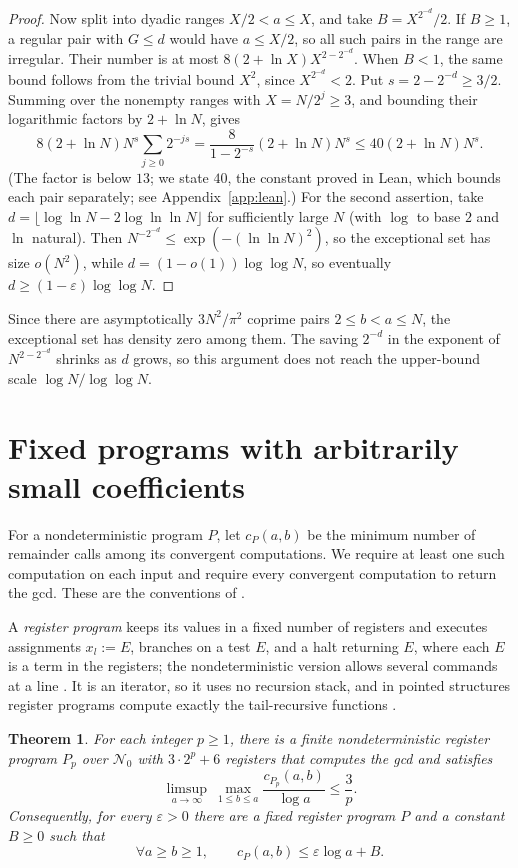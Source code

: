 \documentclass[11pt]{article}
\newtheorem{theorem}{Theorem}
\theoremstyle{remark}
\begin{document}
\begin{proof}
Now split into dyadic ranges $X/2<a\leq X$, and take
$B=X^{2^{-d}}/2$. If $B\geq1$, a regular pair with $G\leq d$ would have
$a\leq X/2$, so all such pairs in the range are irregular. Their number is
at most $8(2+\ln X)X^{2-2^{-d}}$.
When $B<1$, the same bound follows from the trivial bound $X^2$, since
$X^{2^{-d}}<2$.
Put $s=2-2^{-d}\geq3/2$. Summing over the nonempty ranges with
$X=N/2^j\geq3$, and bounding their logarithmic factors by $2+\ln N$, gives
\[
8(2+\ln N)N^s\sum_{j\geq0}2^{-js}
 =\frac{8}{1-2^{-s}}(2+\ln N)N^s
 \leq40(2+\ln N)N^s.
\]
(The factor is below $13$; we state $40$, the constant proved in Lean,
which bounds each pair separately; see Appendix~\ref{app:lean}.)
For the second assertion, take
$d=\lfloor\log\ln N-2\log\ln\ln N\rfloor$ for sufficiently large $N$
(with $\log$ to base $2$ and $\ln$ natural).
Then $N^{-2^{-d}}\leq\exp(-(\ln\ln N)^2)$, so the exceptional set has
size $o(N^2)$, while $d=(1-o(1))\log\log N$, so eventually
$d\geq(1-\varepsilon)\log\log N$.
\end{proof}
Since there are asymptotically $3N^2/\pi^2$ coprime pairs
$2\leq b<a\leq N$, the exceptional set has density zero among them.
The saving $2^{-d}$ in the exponent of $N^{2-2^{-d}}$ shrinks as $d$ grows,
so this argument does not reach the upper-bound scale $\log N/\log\log N$.

\section{Fixed programs with arbitrarily small coefficients}\label{sec:programs}

For a nondeterministic program $P$, let $c_P(a,b)$ be the minimum number of
remainder calls among its convergent computations. We require at least one
such computation on each input and require every convergent computation to
return the gcd. These are the conventions of
\cite[(2E-2), (2E-5)]{moschovakis2019}.

A \emph{register program} keeps its values in a fixed number of registers
and executes assignments $x_l:=E$, branches on a test $E$, and a halt
returning $E$, where each $E$ is a term in the registers; the
nondeterministic version allows several commands at a line
\cite[\S\S2E--2F]{moschovakis2019}. It is an iterator, so it uses no
recursion stack, and in pointed structures register programs compute
exactly the tail-recursive functions \cite[Proposition~2F.1]{moschovakis2019}.

\begin{theorem}\label{thm:registers}
For each integer $p\geq1$, there is a finite nondeterministic register
program $P_p$ over $\mathcal N_0$ with $3\cdot2^p+6$ registers that computes the
gcd and satisfies
\[
\limsup_{a\to\infty}\ \max_{1\leq b\leq a}\frac{c_{P_p}(a,b)}{\log a}\leq\frac3p.
\]
Consequently, for every $\varepsilon>0$ there are a fixed register program
$P$ and a constant $B\geq0$ such that
\[
\forall a\geq b\geq1,\qquad c_P(a,b)\leq\varepsilon\log a+B.
\]
\end{theorem}
\end{document}
